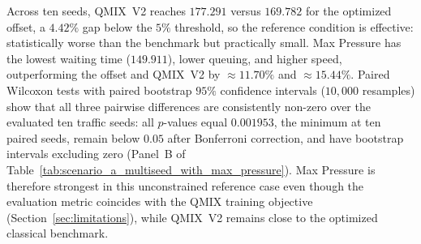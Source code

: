 \documentclass[review,12pt]{elsarticle}
\begin{document}
\begin{table}[H]
\centering
\caption{Ten-seed Scenario~A comparison and paired statistical tests. Panel~A reports mean $\pm$ SD over ten common SUMO seeds; Panel~B reports paired waiting-time differences with bootstrap $95\%$ CIs ($10{,}000$ resamples) and Wilcoxon signed-rank tests.}
\label{tab:scenario_a_multiseed_with_max_pressure}
\end{table}

Across ten seeds, QMIX~V2 reaches $177.291$ versus $169.782$ for the optimized offset, a $4.42\%$ gap below the $5\%$ threshold, so the reference condition is effective: statistically worse than the benchmark but practically small. Max Pressure has the lowest waiting time ($149.911$), lower queuing, and higher speed, outperforming the offset and QMIX~V2 by $\approx11.70\%$ and $\approx15.44\%$. Paired Wilcoxon tests with paired bootstrap $95\%$ confidence intervals ($10{,}000$ resamples) show that all three pairwise differences are consistently non-zero over the evaluated ten traffic seeds: all $p$-values equal $0.001953$, the minimum at ten paired seeds, remain below $0.05$ after Bonferroni correction, and have bootstrap intervals excluding zero (Panel~B of Table~\ref{tab:scenario_a_multiseed_with_max_pressure}). Max Pressure is therefore strongest in this unconstrained reference case even though the evaluation metric coincides with the QMIX training objective (Section~\ref{sec:limitations}), while QMIX~V2 remains close to the optimized classical benchmark.
\end{document}
